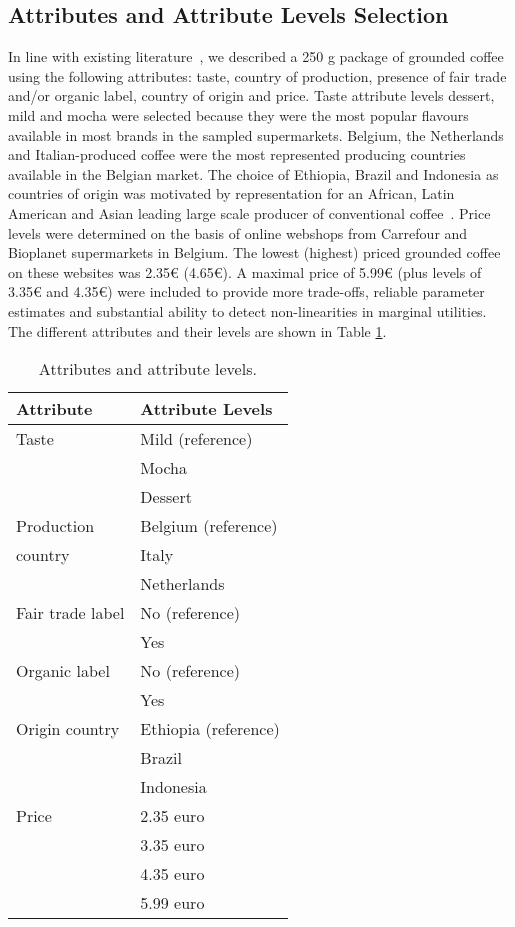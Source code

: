 \documentclass[sustainability,article,accept,moreauthors,pdftex,10pt,a4paper]{Definitions/mdpi}
\theoremstyle{mdpi}
\newcounter{ex}
\newcounter{re}
\theoremstyle{mdpidefinition}
\begin{document}
\subsection{Attributes and Attribute Levels Selection}
\par{In line with existing literature~\cite{DePelsmacker2005,catturani2008,Didier2008,Rotaris2011,Rousseau2015,VanLoo2015, Gallenti2016}, we described a 250 g package of grounded coffee using the following attributes: taste, country of production, presence of fair trade and/or organic label, country of origin and price. Taste attribute levels dessert, mild and mocha were selected because they were the most popular flavours available in most brands in the sampled supermarkets. Belgium, the Netherlands and Italian-produced coffee were the most represented producing countries available in the Belgian market. The choice of Ethiopia, Brazil and Indonesia as countries of origin was motivated by representation for an African, Latin American and Asian leading large scale producer of conventional coffee~\cite{vanDing2010,ICO2017}.  Price levels were determined on the basis of online webshops from Carrefour and Bioplanet supermarkets in Belgium. The lowest (highest) priced grounded coffee on these websites was 2.35\euro \hspace{1mm} (4.65\euro). A maximal price of 5.99\euro \hspace{1mm} (plus levels of 3.35\euro \hspace{1mm} and 4.35\euro) were included to provide more trade-offs, reliable parameter estimates and substantial ability to detect non-linearities in marginal utilities. The different attributes and their levels are shown in Table \ref{table1_attribute}.
\begin{table}[H]
\centering
\caption{Attributes and attribute levels.}
\vspace{-6pt}
\label{table1_attribute}
\begin{tabular}{ p{3.5cm} p{5cm}}\\ \toprule
\textbf{Attribute} & \textbf{Attribute Levels }\\ \midrule
Taste & Mild (reference) \\
& Mocha  \\
& Dessert \\
Production & Belgium (reference)   \\
\hspace{3mm} country & Italy \\
& Netherlands \\
Fair trade label & No (reference)\\
& Yes \\
Organic label & No (reference) \\
& Yes \\
Origin country & Ethiopia (reference)\\
& Brazil \\
& Indonesia \\
Price & 2.35 euro \\
& 3.35 euro \\
& 4.35 euro \\
& 5.99  euro \\ \bottomrule
\end{tabular}
\end{table}
}
\end{document}
